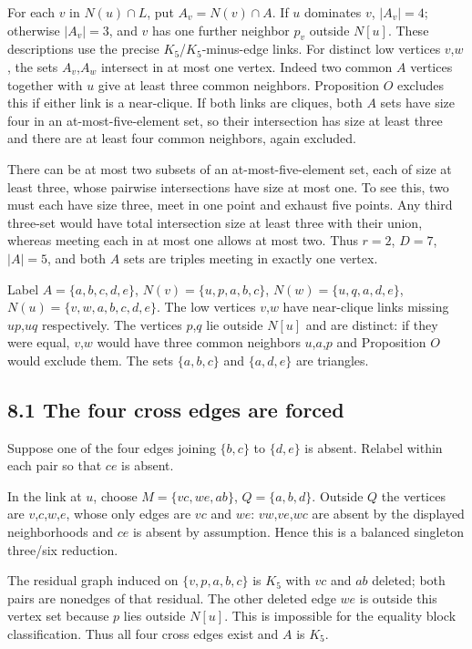 \documentclass[11pt]{article}
\begin{document}
For each \(v\) in \(N(u)\cap L\), put \(A_v=N(v)\cap A\). If \(u\)
dominates \(v\), \(|A_v|=4\); otherwise \(|A_v|=3\), and \(v\) has one
further neighbor \(p_v\) outside \(N[u]\). These descriptions use the
precise \(K_5\)/\(K_5\)-minus-edge links. For distinct low vertices
\(v\),\(w\), the sets \(A_v\),\(A_w\) intersect in at most one vertex.
Indeed two common \(A\) vertices together with \(u\) give at least three
common neighbors. Proposition \(O\) excludes this if either link is a
near-clique. If both links are cliques, both \(A\) sets have size four
in an at-most-five-element set, so their intersection has size at least
three and there are at least four common neighbors, again excluded.

There can be at most two subsets of an at-most-five-element set, each of
size at least three, whose pairwise intersections have size at most one.
To see this, two must each have size three, meet in one point and
exhaust five points. Any third three-set would have total intersection
size at least three with their union, whereas meeting each in at most
one allows at most two. Thus \(r=2\), \(D=7\), \(|A|=5\), and both \(A\)
sets are triples meeting in exactly one vertex.

Label \(A=\{a,b,c,d,e\}\), \(N(v)=\{u,p,a,b,c\}\),
\(N(w)=\{u,q,a,d,e\}\), \(N(u)=\{v,w,a,b,c,d,e\}\). The low vertices
\(v\),\(w\) have near-clique links missing \(up\),\(uq\) respectively.
The vertices \(p\),\(q\) lie outside \(N[u]\) and are distinct: if they
were equal, \(v\),\(w\) would have three common neighbors
\(u\),\(a\),\(p\) and Proposition \(O\) would exclude them. The sets
\(\{a,b,c\}\) and \(\{a,d,e\}\) are triangles.

\subsection{8.1 The four cross edges are
forced}\label{the-four-cross-edges-are-forced}

Suppose one of the four edges joining \(\{b,c\}\) to \(\{d,e\}\) is
absent. Relabel within each pair so that \(ce\) is absent.

In the link at \(u\), choose \(M=\{vc,we,ab\}\), \(Q=\{a,b,d\}\).
Outside \(Q\) the vertices are \(v\),\(c\),\(w\),\(e\), whose only edges
are \(vc\) and \(we\): \(vw\),\(ve\),\(wc\) are absent by the displayed
neighborhoods and \(ce\) is absent by assumption. Hence this is a
balanced singleton three/six reduction.

The residual graph induced on \(\{v,p,a,b,c\}\) is \(K_5\) with \(vc\)
and \(ab\) deleted; both pairs are nonedges of that residual. The other
deleted edge \(we\) is outside this vertex set because \(p\) lies
outside \(N[u]\). This is impossible for the equality block
classification. Thus all four cross edges exist and \(A\) is \(K_5\).
\end{document}
